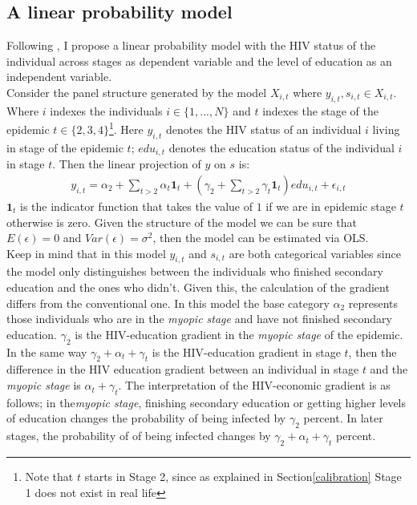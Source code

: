 \subsection{A linear probability model}
Following \cite{raul}, I propose a linear probability model with the HIV status of the individual across stages as dependent variable and the level of education as an independent variable.\\

Consider the panel structure generated by the model $X_{i,t}$ where $y_{i,t}, s_{i,t}\in X_{i,t}$. Where $i$ indexes the individuals $i\in \{1,...,N\}$ and $t$ indexes the stage of the epidemic $t\in \{2,3,4\}$\footnote{Note that $t$ starts in Stage 2, since as explained in Section\ref{calibration} Stage 1 does not exist in real life}. Here $y_{i,t}$ denotes the HIV status of an individual $i$ living in stage of the epidemic $t$; $edu_{i,t}$ denotes the education status of the individual $i$ in stage $t$. Then the linear projection of $y$ on $s$ is:
\begin{align}
y_{i,t}=\alpha_{2}+\sum_{t>2}\alpha_{t}\mathbf{1}_{t}+(\gamma_{2}+\sum_{t>2}\gamma_{t}\mathbf{1}_{t})edu_{i,t}+\epsilon_{i,t}
\end{align}
 $\mathbf{1}_{t}$ is the indicator function that takes the value of $1$ if we are in epidemic stage $t$ otherwise is zero. Given the structure of the model we can be sure that $E(\epsilon)=0$ and $Var(\epsilon)=\sigma^{2}$, then the model can be estimated via OLS.\\
 
 Keep in mind that in this model $y_{i,t}$ and $s_{i,t}$ are both categorical variables since the model only distinguishes between the individuals who finished secondary education and the ones who didn't. Given this, the calculation of the gradient differs from the conventional one. In this model the base category $\alpha_{2}$ represents those individuals who are in the \textit{myopic stage} and have not finished secondary education. $\gamma_{2}$ is the HIV-education gradient in the \textit{myopic stage} of the epidemic. In the same way $\gamma_{2}+\alpha_{t}+\gamma_{t}$ is the HIV-education gradient in stage $t$, then the difference in the HIV education gradient between an individual in stage $t$ and the \textit{myopic stage} is $\alpha_{t}+\gamma_{t}$. The interpretation of the HIV-economic gradient is as follows; in the\textit{myopic stage}, finishing secondary education or getting higher levels of education changes the probability of being infected by $\gamma_{2}$ percent. In later stages, the probability of of being infected changes by $\gamma_{2}+\alpha_{t}+\gamma_{t}$ percent.\\
 
